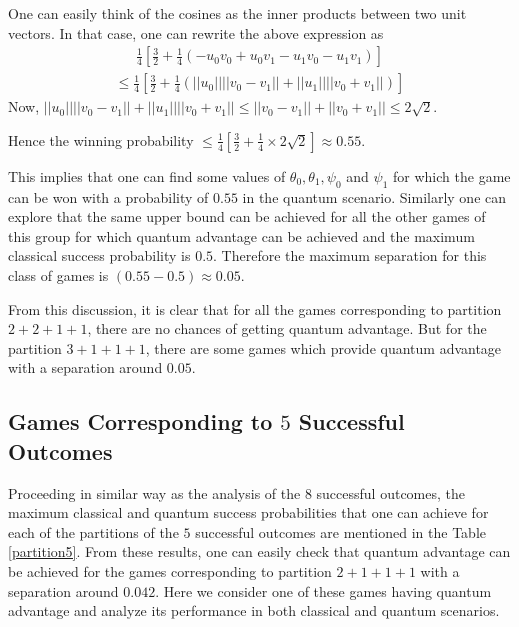 \documentclass[]{svjour3}
\begin{document}
One can easily think of the cosines as the inner products between two unit vectors. In that case, one can rewrite the above expression as
\begin{align*}
\frac{1}{4}\left[\frac{3}{2} + \frac{1}{4}(-u_{0}v_{0} + u_{0}v_{1} - u_{1}v_{0} - u_{1}v_{1})\right]
\end{align*}
\begin{align*}
\le \frac{1}{4} \left[\frac{3}{2} + \frac{1}{4}\left(||u_{0}|| ||v_{0} - v_{1}|| + ||u_{1}|| ||v_{0} + v_{1}||\right) \right]
\end{align*}
Now, $||u_{0}|| ||v_{0} - v_{1}|| + ||u_{1}|| ||v_{0} + v_{1}|| \le ||v_{0} - v_{1}|| + ||v_{0} + v_{1}|| \le 2\sqrt{2}$.

Hence the winning probability 
$\le \frac{1}{4} \left[\frac{3}{2} + \frac{1}{4} \times 2\sqrt{2} \right] \approx 0.55$.

This implies that one can find some values of $\theta_0, \theta_1, \psi_0$ and $\psi_1$ for which the game can be won with a probability of $0.55$ in the quantum scenario. Similarly one can explore that the same upper bound can be achieved for all the other games of this group for which quantum advantage can be achieved and the maximum classical success probability is $0.5$.
Therefore the maximum separation for this class of games is $(0.55 - 0.5) \approx 0.05$.

From this discussion, it is clear that for all the games corresponding to partition $2+2+1+1$, there are no chances of getting quantum advantage. But for the partition $3+1+1+1$, there are some games which provide quantum advantage with a separation around $0.05$. 

\subsection{Games Corresponding to $5$ Successful Outcomes}


Proceeding in similar way as the analysis of the $8$ successful outcomes, the maximum classical and quantum success probabilities that one can achieve for each of the partitions of the $5$ successful outcomes are mentioned in the Table \ref{partition5}. From these results, one can easily check that quantum advantage can be achieved for the games corresponding to partition $2+1+1+1$ with a separation around $0.042$. Here we consider one of these games having quantum advantage and analyze its performance in both classical and quantum scenarios.\\
\end{document}
